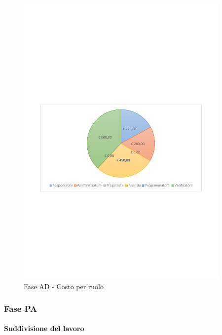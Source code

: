 \documentclass[../PianoProgetto.tex]{subfiles}
\begin{document}
	\begin{figure}[!h]
		\centering
		\includegraphics[width=0.93\textwidth , trim=2cm 9.5cm 2cm 11cm]{grafici/AD/AD-costo}
			\caption{Fase AD - Costo per ruolo}
		\label{fig:CircleChart-faseAD_costo}
	\end{figure}
\vfill		
\newpage	
	\subsubsection{Fase PA}
				\paragraph{Suddivisione del lavoro}
						
\end{document}
